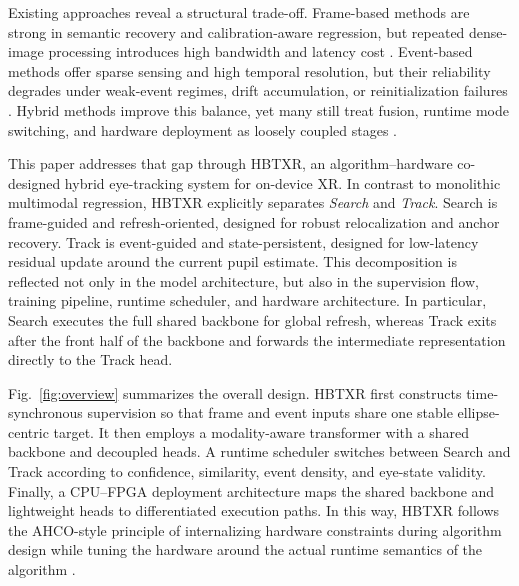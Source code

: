 \documentclass[journal]{IEEEtran}
\begin{document}
Existing approaches reveal a structural trade-off. Frame-based methods are strong in semantic recovery and calibration-aware regression, but repeated dense-image processing introduces high bandwidth and latency cost \cite{ref3}. Event-based methods offer sparse sensing and high temporal resolution, but their reliability degrades under weak-event regimes, drift accumulation, or reinitialization failures \cite{ref4,ref5,ref6}. Hybrid methods improve this balance, yet many still treat fusion, runtime mode switching, and hardware deployment as loosely coupled stages \cite{ref7}.

This paper addresses that gap through HBTXR, an algorithm--hardware co-designed hybrid eye-tracking system for on-device XR. In contrast to monolithic multimodal regression, HBTXR explicitly separates \emph{Search} and \emph{Track}. Search is frame-guided and refresh-oriented, designed for robust relocalization and anchor recovery. Track is event-guided and state-persistent, designed for low-latency residual update around the current pupil estimate. This decomposition is reflected not only in the model architecture, but also in the supervision flow, training pipeline, runtime scheduler, and hardware architecture. In particular, Search executes the full shared backbone for global refresh, whereas Track exits after the front half of the backbone and forwards the intermediate representation directly to the Track head.

Fig.~\ref{fig:overview} summarizes the overall design. HBTXR first constructs time-synchronous supervision so that frame and event inputs share one stable ellipse-centric target. It then employs a modality-aware transformer with a shared backbone and decoupled heads. A runtime scheduler switches between Search and Track according to confidence, similarity, event density, and eye-state validity. Finally, a CPU--FPGA deployment architecture maps the shared backbone and lightweight heads to differentiated execution paths. In this way, HBTXR follows the AHCO-style principle of internalizing hardware constraints during algorithm design while tuning the hardware around the actual runtime semantics of the algorithm \cite{ref12}.
\end{document}
